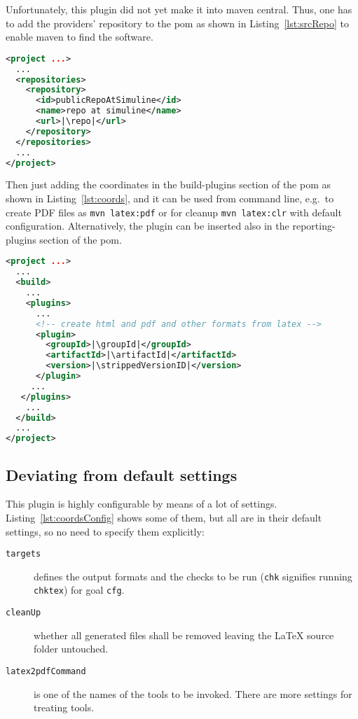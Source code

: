 Unfortunately, this plugin did not yet make it into maven central.
Thus, one has to add the providers' repository to the pom
as shown in Listing~\ref{lst:srcRepo} to enable maven to find the software. 

\begin{lstlisting}[language=xml, basicstyle=\footnotesize,
escapechar=|,
float, captionpos=b, label={lst:srcRepo}, 
caption={The source repository for this plugin}]
<project ...>
  ...
  <repositories>
    <repository>
      <id>publicRepoAtSimuline</id>
      <name>repo at simuline</name>
      <url>|\repo|</url>
    </repository>
  </repositories>
  ...
</project>
\end{lstlisting}

Then just adding the coordinates in the build-plugins section of the pom
as shown in Listing~\ref{lst:coords}, 
and it can be used from command line,
e.g.~to create PDF files as \texttt{mvn latex:pdf}
or for cleanup \texttt{mvn latex:clr} with default configuration. 
Alternatively, the plugin can be inserted also 
in the reporting-plugins section of the pom. 
%
\begin{lstlisting}[language=xml, basicstyle=\footnotesize,
escapechar=|,
float, captionpos=b, label={lst:coords}, 
caption={The coordinates of this plugin}]
<project ...>
  ...
  <build>
    ...
    <plugins>
      ...
      <!-- create html and pdf and other formats from latex -->
      <plugin>
        <groupId>|\groupId|</groupId>
        <artifactId>|\artifactId|</artifactId>
        <version>|\strippedVersionID|</version>
      </plugin>
     ...
   </plugins>
    ...
  </build>
  ...
</project>
\end{lstlisting}

\subsection{Deviating from default settings}\label{subsec:xmlPomSettings}

This plugin is highly configurable by means of a lot of settings. 
Listing~\ref{lst:coordsConfig} shows some of them, but all are in their default settings, 
so no need to specify them explicitly: 
%
\begin{description}
\item[\texttt{targets}] defines the output formats and the checks to be run 
(\texttt{chk} signifies running \texttt{chktex}) for goal \texttt{cfg}. 
\item[\texttt{cleanUp}] whether all generated files shall be removed 
leaving the \LaTeX{} source folder untouched. 
\item[\texttt{latex2pdfCommand}] is one of the names of the tools to be invoked. 
There are more settings for treating tools. 
\end{description}

